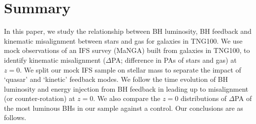 \documentclass[fleqn,usenatbib]{mnras}
\begin{document}
\section{Summary} \label{sec:conclusion}

In this paper, we study the relationship between BH luminosity, BH feedback and kinematic misalignment between stars and gas for galaxies in TNG100. We use mock observations of an IFS survey (MaNGA) built from galaxies in TNG100, to identify kinematic misalignment ($\Delta$PA; difference in PAs of stars and gas) at $z=0$. We split our mock IFS sample on stellar mass to separate the impact of `quasar' and `kinetic' feedback modes. We follow the time evolution of BH luminosity and energy injection from BH feedback in leading up to misalignment (or counter-rotation) at $z=0$. We also compare the $z=0$ distributions of $\Delta$PA of the most luminous BHs in our sample against a control. Our conclusions are as follows.
\end{document}
